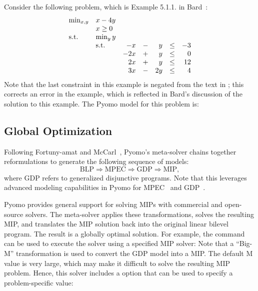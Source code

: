 Consider the following problem, which is Example 5.1.1. in Bard~\citep{Bard98}:
\begin{equation}
\begin{array}{llrrrrrr}
\min_{x, y}     & x - 4 y & &&&&\\
                & x \geq 0 & &&&&\\
\textrm{s.t.}             & \min_{y} y & &&&&\\
                & \textrm{s.t.}   & - x &- &y &\leq &-3\\
                &       & -2 x &+ &y &\leq &0\\
                &       & 2 x &+ &y &\leq &12\\
                &       & 3 x &- &2 y &\leq &4
\end{array}
\end{equation}
Note that the last constraint in this example is negated from the text in \citet{Bard98};  this corrects an error in the example, which is reflected in Bard's discussion of the solution to this example.  The Pyomo model for this problem is:


\subsection{Global Optimization}

Following Fortuny-amat and McCarl~\cite{ForMcC81}, Pyomo's
 meta-solver chains together reformulations
to generate the following sequence of models:
\[
\textrm{BLP} \Rightarrow \textrm{MPEC} \Rightarrow \textrm{GDP} \Rightarrow \textrm{MIP},
\]
where GDP refers to generalized disjunctive programs.  Note that
this leverages advanced modeling capabilities in Pyomo for
MPEC~\cite{PyomoMPEC} and GDP~\cite{PyomoGDP}.

Pyomo provides general support for solving MIPs with commercial and
open-source solvers.  The  meta-solver
applies these transformations, solves the resulting MIP, and
translates the MIP solution back into the original linear bilevel
program.  The result is a globally optimal solution.  For example,
the  command can be used to execute the
 solver using a specified MIP solver:
Note that a ``Big-M'' transformation is used to convert the GDP
model into a MIP.  The default M value is very large, which may
make it difficult to solve the resulting MIP problem.  Hence, this solver includes
a  option that can be used to specify a problem-specific value:

